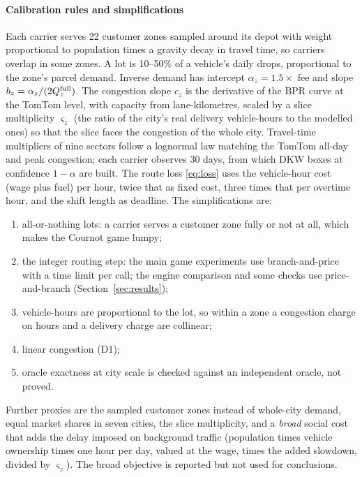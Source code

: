 \documentclass[preprint,11pt]{elsarticle}
\theoremstyle{definition}
\theoremstyle{remark}
\begin{document}
\paragraph{Calibration rules and simplifications} Each carrier serves 22 customer zones sampled around its depot with weight proportional to population times a gravity decay in travel time, so carriers overlap in some zones. A lot is 10--50\% of a vehicle's daily drops, proportional to the zone's parcel demand. Inverse demand has intercept $\alpha_z=1.5\times$ fee and slope $b_z=\alpha_z/(2Q_z^{\rm full})$. The congestion slope $c_z$ is the derivative of the BPR curve at the TomTom level, with capacity from lane-kilometres, scaled by a slice multiplicity $\varsigma_z$ (the ratio of the city's real delivery vehicle-hours to the modelled ones) so that the slice faces the congestion of the whole city. Travel-time multipliers of nine sectors follow a lognormal law matching the TomTom all-day and peak congestion; each carrier observes 30 days, from which DKW boxes at confidence $1-\alpha$ are built. The route loss \eqref{eq:loss} uses the vehicle-hour cost (wage plus fuel) per hour, twice that as fixed cost, three times that per overtime hour, and the shift length as deadline. The simplifications are:
\begin{enumerate}[label=(C\arabic*),leftmargin=*,itemsep=0pt]
\item all-or-nothing lots: a carrier serves a customer zone fully or not at all, which makes the Cournot game lumpy;
\item the integer routing step: the main game experiments use branch-and-price with a time limit per call; the engine comparison and some checks use price-and-branch (Section~\ref{sec:results});
\item vehicle-hours are proportional to the lot, so within a zone a congestion charge on hours and a delivery charge are collinear;
\item linear congestion (D1);
\item oracle exactness at city scale is checked against an independent oracle, not proved.
\end{enumerate}
Further proxies are the sampled customer zones instead of whole-city demand, equal market shares in seven cities, the slice multiplicity, and a \emph{broad} social cost that adds the delay imposed on background traffic (population times vehicle ownership times one hour per day, valued at the wage, times the added slowdown, divided by $\varsigma_z$). The broad objective is reported but not used for conclusions.
\end{document}
